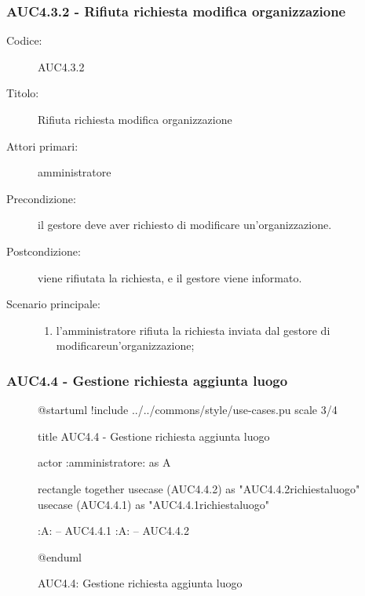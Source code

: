 \documentclass[casi-duso]{subfiles}
\begin{document}
\subsubsection{AUC4.3.2 - Rifiuta richiesta modifica organizzazione}%
\label{subsub:AUC4.3.2}
\begin{description}
  \item[Codice:] AUC4.3.2
  \item[Titolo:] Rifiuta richiesta modifica organizzazione
  \item[Attori primari:] amministratore
  \item[Precondizione:] il gestore deve aver richiesto di modificare un'organizzazione.
  \item[Postcondizione:] viene rifiutata la richiesta, e il gestore viene informato.
  \item[Scenario principale:]
  \begin{enumerate}
    \item l'amministratore rifiuta la richiesta inviata dal gestore di modificareun'organizzazione;
  \end{enumerate}
\end{description}

\subsubsection{AUC4.4 - Gestione richiesta aggiunta luogo}%
\label{subsub:AUC4.4}

\begin{figure}[h!] 
  \centering 
  \begin{plantuml}
  @startuml
  !include ../../commons/style/use-cases.pu
  scale 3/4

  title AUC4.4 - Gestione richiesta aggiunta luogo

  actor :amministratore: as A

  rectangle {
    together {
      usecase (AUC4.4.2) as "AUC4.4.2\nRifiuta richiesta\naggiungi luogo"
      usecase (AUC4.4.1) as "AUC4.4.1\nAccetta richiesta\naggiungi luogo"
    }
  }

  :A: -- AUC4.4.1
  :A: -- AUC4.4.2

  @enduml
  \end{plantuml} 
  \caption{AUC4.4: Gestione richiesta aggiunta luogo} 
  \label{fig:auc4_4} 
\end{figure}
\end{document}
